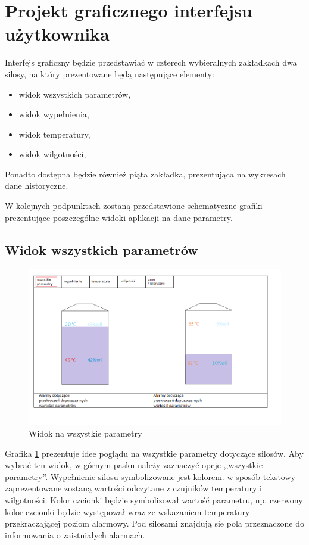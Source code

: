 \section{Projekt graficznego interfejsu użytkownika}
    Interfejs graficzny będzie przedstawiać w czterech wybieralnych zakładkach dwa silosy, na który prezentowane będą następujące elementy:
        \begin{itemize}
            \item widok wszystkich parametrów,
            \item widok wypełnienia,
            \item widok temperatury,
            \item widok wilgotności,
        \end{itemize}
    Ponadto dostępna będzie również piąta zakładka, prezentująca na wykresach dane historyczne.
    
    W kolejnych podpunktach zostaną przedstawione schematyczne grafiki prezentujące poszczególne widoki aplikacji
    na dane parametry.

    \subsection{Widok wszystkich parametrów}
        \begin{figure}[H]
            \centering
            \includegraphics[width = \textwidth]{obrazy/projekt_grafiki/all.png}
            \caption{Widok na wszystkie parametry}
            \label{fig: all}
        \end{figure}
        Grafika \ref{fig: all} prezentuje idee poglądu na wszystkie parametry dotyczące silosów. Aby wybrać ten widok,
        w górnym pasku należy zaznaczyć opcje ,,wszystkie parametry''. Wypełnienie silosu symbolizowane jest kolorem. 
        w sposób tekstowy zaprezentowane zostaną wartości odczytane z czujników temperatury i wilgotności. Kolor czcionki
        będzie symbolizował wartość parametru, np. czerwony kolor czcionki będzie występował wraz ze wskazaniem temperatury 
        przekraczającej poziom alarmowy. Pod silosami znajdują sie pola przeznaczone do informowania o zaistniałych alarmach.

